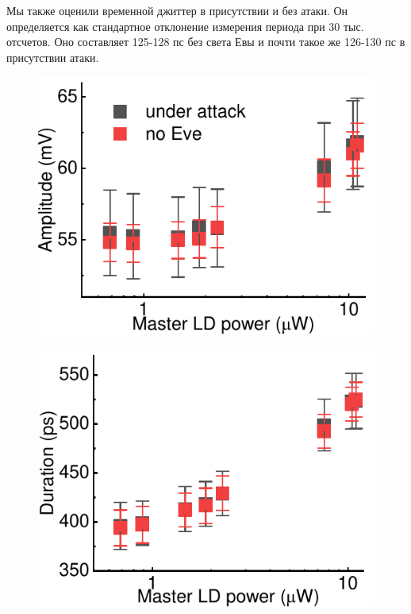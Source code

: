 Мы также оценили временной джиттер в присутствии и без атаки. Он определяется как стандартное отклонение измерения периода при 30 тыс. отсчетов. Оно составляет 125-128 пс  без света Евы и почти такое же 126-130 пс в присутствии атаки. 

\begin{figure}%
	\centering
	\includegraphics[width=\textwidth]{images/amplitude_change.pdf}
	\caption{}
\end{figure}

\begin{figure}%
	\includegraphics[width=\textwidth]{images/duration_change.pdf}
	\caption{}
\end{figure}

